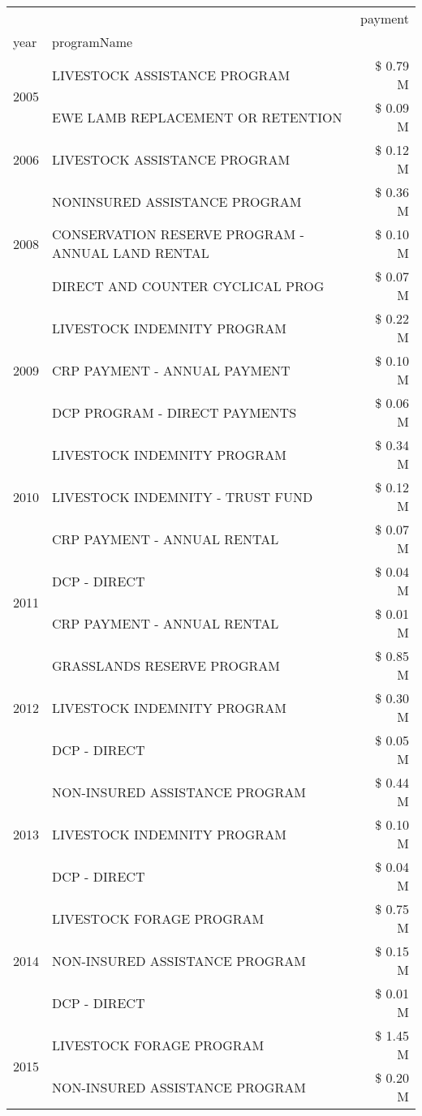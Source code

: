 \begin{tabular}{llr}
\toprule
 &  & payment \\
year & programName &  \\
\midrule
\multirow[t]{2}{*}{2005} & LIVESTOCK ASSISTANCE PROGRAM & \$ 0.79 M \\
 & EWE LAMB REPLACEMENT OR RETENTION & \$ 0.09 M \\
\cline{1-3}
2006 & LIVESTOCK ASSISTANCE PROGRAM & \$ 0.12 M \\
\cline{1-3}
\multirow[t]{3}{*}{2008} & NONINSURED ASSISTANCE PROGRAM & \$ 0.36 M \\
 & CONSERVATION RESERVE PROGRAM - ANNUAL LAND RENTAL & \$ 0.10 M \\
 & DIRECT AND COUNTER CYCLICAL PROG & \$ 0.07 M \\
\cline{1-3}
\multirow[t]{3}{*}{2009} & LIVESTOCK INDEMNITY PROGRAM & \$ 0.22 M \\
 & CRP PAYMENT - ANNUAL PAYMENT & \$ 0.10 M \\
 & DCP PROGRAM - DIRECT PAYMENTS & \$ 0.06 M \\
\cline{1-3}
\multirow[t]{3}{*}{2010} & LIVESTOCK INDEMNITY PROGRAM & \$ 0.34 M \\
 & LIVESTOCK INDEMNITY - TRUST FUND & \$ 0.12 M \\
 & CRP PAYMENT - ANNUAL RENTAL & \$ 0.07 M \\
\cline{1-3}
\multirow[t]{2}{*}{2011} & DCP - DIRECT & \$ 0.04 M \\
 & CRP PAYMENT - ANNUAL RENTAL & \$ 0.01 M \\
\cline{1-3}
\multirow[t]{3}{*}{2012} & GRASSLANDS RESERVE PROGRAM & \$ 0.85 M \\
 & LIVESTOCK INDEMNITY PROGRAM & \$ 0.30 M \\
 & DCP - DIRECT & \$ 0.05 M \\
\cline{1-3}
\multirow[t]{3}{*}{2013} & NON-INSURED ASSISTANCE PROGRAM & \$ 0.44 M \\
 & LIVESTOCK INDEMNITY PROGRAM & \$ 0.10 M \\
 & DCP - DIRECT & \$ 0.04 M \\
\cline{1-3}
\multirow[t]{3}{*}{2014} & LIVESTOCK FORAGE PROGRAM & \$ 0.75 M \\
 & NON-INSURED ASSISTANCE PROGRAM & \$ 0.15 M \\
 & DCP - DIRECT & \$ 0.01 M \\
\cline{1-3}
\multirow[t]{3}{*}{2015} & LIVESTOCK FORAGE PROGRAM & \$ 1.45 M \\
 & NON-INSURED ASSISTANCE PROGRAM & \$ 0.20 M \\

\end{tabular}
